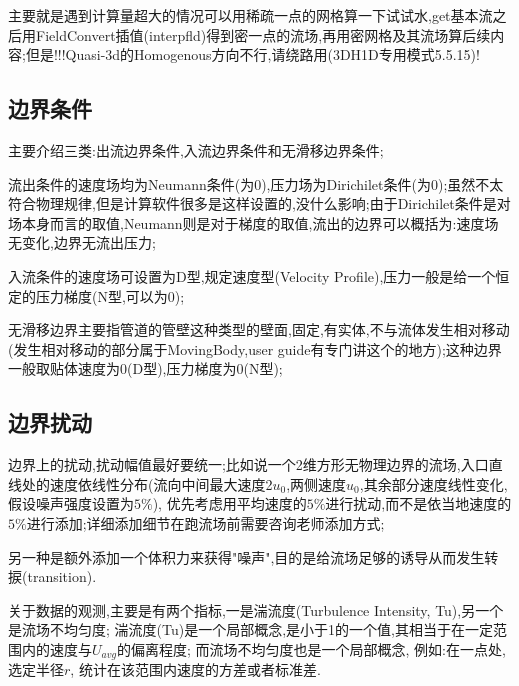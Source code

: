 主要就是遇到计算量超大的情况可以用稀疏一点的网格算一下试试水,get基本流之后用FieldConvert插值(interpfld)得到密一点的流场,再用密网格及其流场算后续内容;但是!!!Quasi-3d的Homogenous方向不行,请绕路用(3DH1D专用模式5.5.15)!



\subsection{边界条件} \label{BoundaryOther}
主要介绍三类:出流边界条件,入流边界条件和无滑移边界条件;\par
流出条件的速度场均为Neumann条件(为0),压力场为Dirichilet条件(为0);虽然不太符合物理规律,但是计算软件很多是这样设置的,没什么影响;由于Dirichilet条件是对场本身而言的取值,Neumann则是对于梯度的取值,流出的边界可以概括为:速度场无变化,边界无流出压力;\par
入流条件的速度场可设置为D型,规定速度型(Velocity Profile),压力一般是给一个恒定的压力梯度(N型,可以为0);\par
无滑移边界主要指管道的管壁这种类型的壁面,固定,有实体,不与流体发生相对移动(发生相对移动的部分属于MovingBody,user guide有专门讲这个的地方);这种边界一般取贴体速度为0(D型),压力梯度为0(N型);

\subsection{边界扰动}

边界上的扰动,扰动幅值最好要统一;比如说一个2维方形无物理边界的流场,入口直线处的速度依线性分布(流向中间最大速度2$u_0$,两侧速度$u_0$,其余部分速度线性变化,假设噪声强度设置为$5\%$), 优先考虑用平均速度的$5\%$进行扰动,而不是依当地速度的$5\%$进行添加;详细添加细节在跑流场前需要咨询老师添加方式;\par
另一种是额外添加一个体积力来获得"噪声",目的是给流场足够的诱导从而发生转捩(transition).\par
关于数据的观测,主要是有两个指标,一是湍流度(Turbulence Intensity, Tu),另一个是流场不均匀度; 湍流度(Tu)是一个局部概念,是小于1的一个值,其相当于在一定范围内的速度与$U_{avg}$的偏离程度; 而流场不均匀度也是一个局部概念, 例如:在一点处,选定半径$r$, 统计在该范围内速度的方差或者标准差.\par



